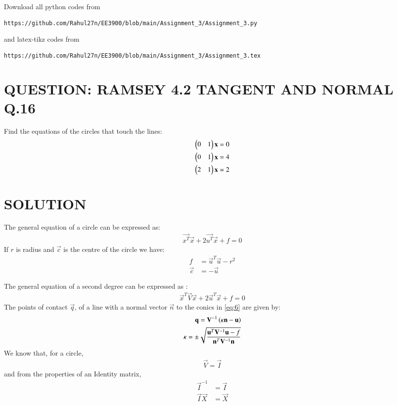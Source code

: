 \documentclass[journal,12pt,twocolumn]{IEEEtran}
\begin{document}
\maketitle
\newpage
\bigskip
\renewcommand{\thefigure}{\theenumi}
\renewcommand{\thetable}{\theenumi}
Download all python codes from 
\begin{lstlisting}
https://github.com/Rahul27n/EE3900/blob/main/Assignment_3/Assignment_3.py
\end{lstlisting}
%
and latex-tikz codes from 
%
\begin{lstlisting}
https://github.com/Rahul27n/EE3900/blob/main/Assignment_3/Assignment_3.tex
\end{lstlisting}
\vspace{0.5cm}
\section{QUESTION: RAMSEY 4.2 TANGENT AND NORMAL Q.16}
Find the equations of the circles that touch the lines:
\begin{align}
\begin{pmatrix}0 & 1\end{pmatrix}\mathbf{x} &= 0 \label{eq:1}
\\\begin{pmatrix}0 & 1\end{pmatrix}\mathbf{x} &= 4 \label{eq:2}
\\\begin{pmatrix}2 & 1\end{pmatrix}\mathbf{x} &= 2 \label{eq:3}
\end{align}
\section{SOLUTION}
The general equation of a circle can be expressed as:
\begin{align}
\vec{x^T}\vec{x} + 2\vec{u^T}\vec{x} + f = 0 \label{eq:4}
\end{align}
If $r$ is radius and $\vec{c}$ is the centre of the circle we have:
\begin{align}
f &=\vec{u}^T\vec{u}-r^2  \label{eq:5} \\  
\vec{c} &=-\vec{u}
\end{align}

The general equation of a second degree can be expressed as :
\begin{align}
\vec{x}^T\vec{V}\vec{x}+2\vec{u}^T\vec{x}+f=0\label{eq:6}
\end{align}
The points of contact $\vec{q}$, of a line with a normal vector $\vec{n}$ to the conics in \eqref{eq:6} are given by:
\begin{align}
\mathbf{q} = \mathbf{V}^{-1}\left(\kappa \mathbf{n}-\mathbf{u}\right) \label{eq:7} \\
\kappa = \pm \sqrt{\frac{\mathbf{u}^T\mathbf{V}^{-1}\mathbf{u}-f}{\mathbf{n}^T\mathbf{V}^{-1}\mathbf{n}}}\label{eq:8}
\end{align}
We know that, for a circle, 
\begin{align}
\vec{V} = \vec{I}\label{eq:9}  
\end{align}
and from the properties of an Identity matrix, 
\begin{align}
\vec{I}^{-1} &= \vec{I} \\
\vec{I}\vec{X} &= \vec{X}   
\end{align}
\end{document}
